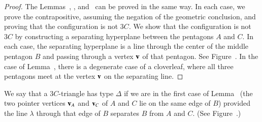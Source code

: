 

\begin{proof} The Lemmas~, ,
  and~ can be proved in the same way.  In each case,
  we prove the contrapositive, assuming the negation of the geometric
  conclusion, and proving that the configuration is not $3C$.  We show
  that the configuration is not $3C$ by constructing a separating
  hyperplane between the pentagons $A$ and $C$.  In each case, the
  separating hyperplane is a line through the center of the middle
  pentagon $B$ and passing through a vertex ${\mathbf v}$ of that pentagon.
  See Figure~.  In the case of Lemma~,
  there is a degenerate case of a cloverleaf, where all three
  pentagons meet at the vertex ${\mathbf v}$ on the separating line.
\end{proof}

\begin{definition}[$\Delta$]
  We say that a $3C$-triangle has type $\Delta$ if we are in the first
  case of Lemma~ (the two pointer vertices ${\mathbf v}_A$ and
  ${\mathbf v}_C$ of $A$ and $C$ lie on the same edge of $B$) provided the line
  $\lambda$ through that edge of $B$ separates $B$ from $A$ and
  $C$. (See Figure~.)
\end{definition}



